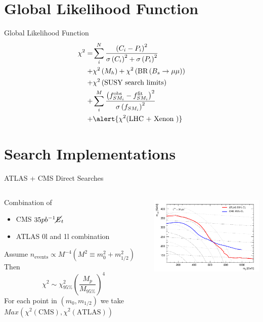 \documentclass{beamer}
\begin{document}
\section{Global Likelihood Function}
\begin{frame}{Global Likelihood Function}
\begin{eqnarray}
  \chi^{2}=&\sum_{i}^{N}\frac{\left(C_{i}-P_{i}\right)^2}{\sigma\left(C_{i}\right)^2+\sigma\left(P_{i}\right)^2}\\
	  +&\chi^{2}\left(M_{h}\right)+\chi^{2}\left(\textrm{BR}\left(B_{s}\rightarrow\mu\mu\right)\right)\\
	  +&\chi^{2}\left(\textrm{SUSY search limits}\right)\\
	  +&\sum_{i}^{M}\frac{\left(f_{SM_{i}}^{\textrm{obs}}-f_{SM_{i}}^{\textrm{fit}}\right)^{2}}{\sigma\left(f_{SM_{i}}\right)^{2}}\\
    +&\alert{\chi^{2}(\textrm{LHC + Xenon })}
\end{eqnarray}
\end{frame}

\section{Search Implementations}
\begin{frame}{ATLAS + CMS Direct Searches}
  \begin{columns}
    \begin{column}{0.5\textwidth}
      Combination of
      \begin{itemize}
        \item CMS $35pb^{-1} \cancel{E}_{t}$
        \item ATLAS 0l and 1l combination
      \end{itemize}
      Assume $n_{\textrm{events}}\propto M^{-4} (M^{2}\equiv m_{0}^{2}+m_{1/2}^{2})$
      Then
      \begin{equation*}
        \chi^{2}\sim\chi^{2}_{95\%}\left(\frac{M_{p}}{M_{95\%}}\right)^{4}
      \end{equation*}
      For each point in $\left(m_{0},m_{1/2}\right)$ we take\\
      \small$Max\left(\chi^{2}\left(\textrm{CMS}\right),\chi^{2}\left(\textrm{ATLAS}\right)\right)$
    \end{column}
    \begin{column}{0.5\textwidth}
            \includegraphics[height=4cm]{atlascms.pdf}
    \end{column}
  \end{columns}
\end{frame}
\end{document}
